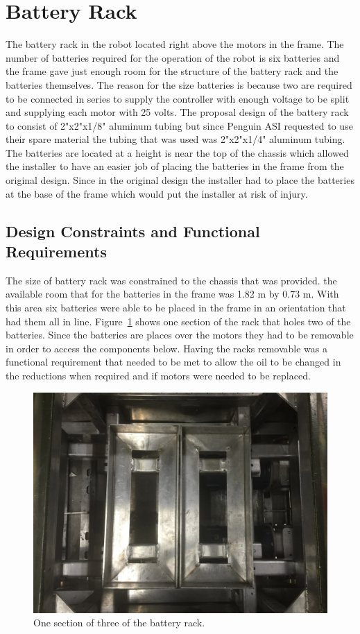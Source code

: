 \section{Battery Rack}
The battery rack in the robot located right above the motors in the frame. The number of batteries required for the operation of the robot is six batteries and the frame gave just enough room for the structure of the battery rack and the batteries themselves. The reason for the size batteries is because two are required to be connected in series to supply the controller with enough voltage to be split and supplying each motor with 25 volts. The proposal design of the battery rack to consist of 2"x2"x1/8" aluminum tubing but since Penguin ASI requested to use their spare material the tubing that was used was 2"x2"x1/4" aluminum tubing. The batteries are located at a height is near the top of the chassis which allowed the installer to have an easier job of placing the batteries in the frame from the original design. Since in the original design the installer had to place the batteries at the base of the frame which would put the installer at risk of injury. 
\subsection{Design Constraints and Functional Requirements}
The size of battery rack was constrained to the chassis that was provided. the available room that for the batteries in the frame was 1.82 m by 0.73 m. With this area six batteries were able to be placed in the frame in an orientation that had them all in line. Figure~\ref{fig:battery_rack_section} shows one section of the rack that holes two of the batteries. Since the batteries are places over the motors they had to be removable in order to access the components below. Having the racks removable was a functional requirement that needed to be met to allow the oil to be changed in the reductions when required and if motors were needed to be replaced.
\begin{figure}[htbp]
	\includegraphics[width=\linewidth]{images/battery_rack_mid_bld.jpg}
	\caption{One section of three of the battery rack.}
	\label{fig:battery_rack_section}
\end{figure}
